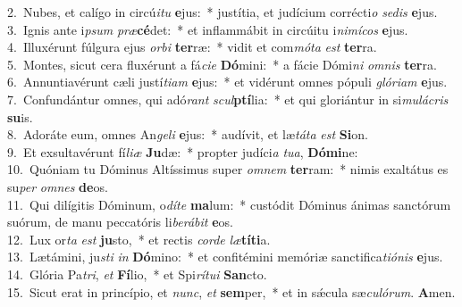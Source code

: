 {2.~}Nubes, et calígo in circú\textit{i}\textit{tu} \textbf{e}jus:~* justítia, et judícium corrécti\textit{o} \textit{se}\textit{dis} \textbf{e}jus.\\
{3.~}Ignis ante i\textit{psum} \textit{præ}\textbf{cé}det:~* et inflammábit in circúitu i\textit{ni}\textit{mí}\textit{cos} \textbf{e}jus.\\
{4.~}Illuxérunt fúlgura ejus \textit{or}\textit{bi} \textbf{ter}ræ:~* vidit et com\textit{mó}\textit{ta} \textit{est} \textbf{ter}ra.\\
{5.~}Montes, sicut cera fluxérunt a fá\textit{ci}\textit{e} \textbf{Dó}mini:~* a fácie Dómi\textit{ni} \textit{om}\textit{nis} \textbf{ter}ra.\\
{6.~}Annuntiavérunt cæli justí\textit{ti}\textit{am} \textbf{e}jus:~* et vidérunt omnes pópuli \textit{gló}\textit{ri}\textit{am} \textbf{e}jus.\\
{7.~}Confundántur omnes, qui adó\textit{rant} \textit{scul}\textbf{ptí}lia:~* et qui gloriántur in si\textit{mu}\textit{lá}\textit{cris} \textbf{su}is.\\
{8.~}Adoráte eum, omnes An\textit{ge}\textit{li} \textbf{e}jus:~* audívit, et læ\textit{tá}\textit{ta} \textit{est} \textbf{Si}on.\\
{9.~}Et exsultavérunt fí\textit{li}\textit{æ} \textbf{Ju}dæ:~* propter judíci\textit{a} \textit{tu}\textit{a}, \textbf{Dó}\textbf{mi}ne:\\
{10.~}Quóniam tu Dóminus Altíssimus super \textit{om}\textit{nem} \textbf{ter}ram:~* nimis exaltátus es su\textit{per} \textit{om}\textit{nes} \textbf{de}os.\\
{11.~}Qui dilígitis Dóminum, o\textit{dí}\textit{te} \textbf{ma}lum:~* custódit Dóminus ánimas sanctórum suórum, de manu peccatóris li\textit{be}\textit{rá}\textit{bit} \textbf{e}os.\\
{12.~}Lux or\textit{ta} \textit{est} \textbf{ju}sto,~* et rectis \textit{cor}\textit{de} \textit{læ}\textbf{tí}\textbf{ti}a.\\
{13.~}Lætámini, ju\textit{sti} \textit{in} \textbf{Dó}mino:~* et confitémini memóriæ sanctifica\textit{ti}\textit{ó}\textit{nis} \textbf{e}jus.\\
{14.~}Glória Pa\textit{tri}, \textit{et} \textbf{Fí}lio,~* et Spi\textit{rí}\textit{tu}\textit{i} \textbf{San}cto.\\
{15.~}Sicut erat in princípio, et \textit{nunc}, \textit{et} \textbf{sem}per,~* et in sǽcula sæ\textit{cu}\textit{ló}\textit{rum}. \textbf{A}men.\\
